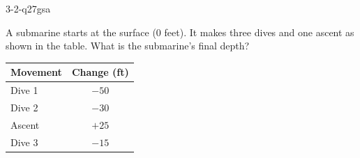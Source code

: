 \begin{practiceQuestion}{3-2-q27}{gsa}
\begin{questionText}
A submarine starts at the surface ($0$ feet). It makes three dives and one ascent as shown in the table. What is the submarine's final depth?

\begin{center}
\begin{tabular}{|l|c|}
\hline
\textbf{Movement} & \textbf{Change (ft)} \\
\hline
Dive 1 & $-50$ \\ \hline
Dive 2 & $-30$ \\ \hline
Ascent & $+25$ \\ \hline
Dive 3 & $-15$ \\ \hline
\end{tabular}
\end{center}
\end{questionText}
\end{practiceQuestion}
